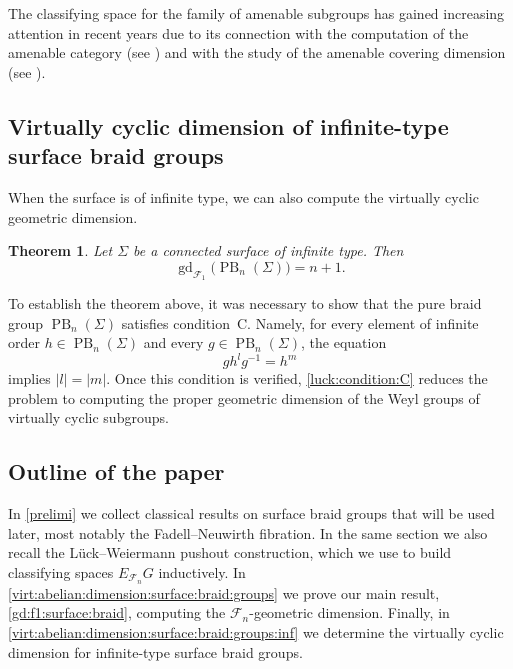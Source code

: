 \documentclass[a4paper,12pt,leqno]{amsart}
\newtheorem{theorem}{Theorem}[section]
\theoremstyle{definition}
\DeclareMathOperator{\gd}{gd}
\DeclareMathOperator{\pb}{PB}
\begin{document}
The classifying space for the family of amenable subgroups has gained increasing attention in recent years due to its connection with the computation of the amenable category (see \cite{MR4474790}) and with the study of the amenable covering dimension (see \cite{MR4162286} \cite{2022arXiv220205606L}).



\subsection*{Virtually cyclic dimension of infinite-type surface braid groups}
When the surface is of infinite type, we can also compute the virtually cyclic geometric dimension.  

\begin{theorem}
Let \( \Sigma \) be a connected surface of infinite type. Then
\[
\gd_{\mathcal{F}_1}\bigl(\pb_n(\Sigma)\bigr) = n + 1.
\]
\end{theorem}

To establish the theorem above, it was necessary to show that the pure braid group \(\pb_n(\Sigma)\) satisfies condition~C. Namely, for every element of infinite order \(h \in \pb_n(\Sigma)\) and every \(g \in \pb_n(\Sigma)\), the equation 
\[
g h^l g^{-1} = h^m
\]
implies \(\lvert l \rvert = \lvert m \rvert\). Once this condition is verified, \cref{luck:condition:C} reduces the problem to computing the proper geometric dimension of the Weyl groups of virtually cyclic subgroups.

\subsection*{Outline of the paper}
In \cref{prelimi} we collect classical results on surface braid groups that will be used later, most notably the Fadell--Neuwirth fibration. In the same section we also recall the L\"uck--Weiermann pushout construction, which we use to build classifying spaces \(E_{\mathcal{F}_n}G\) inductively. In \cref{virt:abelian:dimension:surface:braid:groups} we prove our main result, \cref{gd:f1:surface:braid}, computing the \(\mathcal{F}_n\)-geometric dimension. Finally, in \cref{virt:abelian:dimension:surface:braid:groups:inf} we determine the virtually cyclic dimension for infinite-type surface braid groups.
\end{document}
